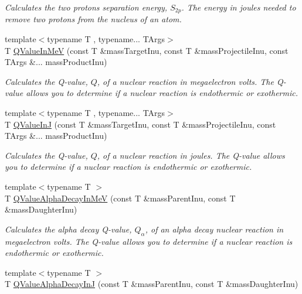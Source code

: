 \begin{DoxyCompactItemize}
\begin{DoxyCompactList}\small\item\em Calculates the two protons separation energy, $S_{2p}$. The energy in joules needed to remove two protons from the nucleus of an atom. \end{DoxyCompactList}\item 
{\footnotesize template$<$typename T , typename... T\+Args$>$ }\\T \hyperlink{group___q_value_ga40937601d7aa0aac2a7ca005ef2d2a8b}{Q\+Value\+In\+MeV} (const T \&mass\+Target\+Inu, const T \&mass\+Projectile\+Inu, const T\+Args \&... mass\+Product\+Inu)
\begin{DoxyCompactList}\small\item\em Calculates the Q-\/value, $Q$, of a nuclear reaction in megaelectron volts. The Q-\/value allows you to determine if a nuclear reaction is endothermic or exothermic. \end{DoxyCompactList}\item 
{\footnotesize template$<$typename T , typename... T\+Args$>$ }\\T \hyperlink{group___q_value_ga377e1e8298a32359ac68025fb1dd8151}{Q\+Value\+InJ} (const T \&mass\+Target\+Inu, const T \&mass\+Projectile\+Inu, const T\+Args \&... mass\+Product\+Inu)
\begin{DoxyCompactList}\small\item\em Calculates the Q-\/value, $Q$, of a nuclear reaction in joules. The Q-\/value allows you to determine if a nuclear reaction is endothermic or exothermic. \end{DoxyCompactList}\item 
{\footnotesize template$<$typename T $>$ }\\T \hyperlink{group___q_value_ga18e054c21cd5f87744e9f5aadc959a54}{Q\+Value\+Alpha\+Decay\+In\+MeV} (const T \&mass\+Parent\+Inu, const T \&mass\+Daughter\+Inu)
\begin{DoxyCompactList}\small\item\em Calculates the alpha decay Q-\/value, $Q_{\alpha}$, of an alpha decay nuclear reaction in megaelectron volts. The Q-\/value allows you to determine if a nuclear reaction is endothermic or exothermic. \end{DoxyCompactList}\item 
{\footnotesize template$<$typename T $>$ }\\T \hyperlink{group___q_value_ga3e767be294dae24e1df18e7ccb8989e6}{Q\+Value\+Alpha\+Decay\+InJ} (const T \&mass\+Parent\+Inu, const T \&mass\+Daughter\+Inu)

\end{DoxyCompactItemize}
